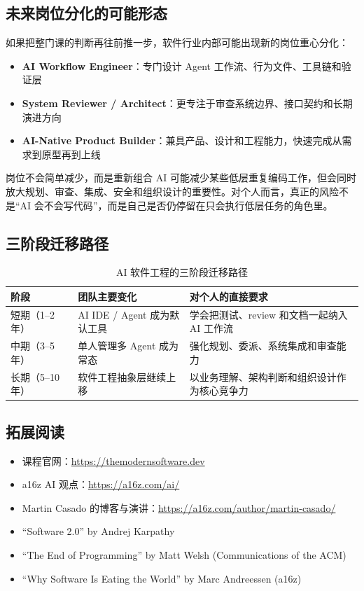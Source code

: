 \subsection{未来岗位分化的可能形态}

如果把整门课的判断再往前推一步，软件行业内部可能出现新的岗位重心分化：

\begin{itemize}
    \item \textbf{AI Workflow Engineer}：专门设计 Agent 工作流、行为文件、工具链和验证层
    \item \textbf{System Reviewer / Architect}：更专注于审查系统边界、接口契约和长期演进方向
    \item \textbf{AI-Native Product Builder}：兼具产品、设计和工程能力，快速完成从需求到原型再到上线
\end{itemize}

\begin{warningbox}{岗位不会简单减少，而是重新组合}
AI 可能减少某些低层重复编码工作，但会同时放大规划、审查、集成、安全和组织设计的重要性。对个人而言，真正的风险不是“AI 会不会写代码”，而是自己是否仍停留在只会执行低层任务的角色里。
\end{warningbox}

\subsection{三阶段迁移路径}

\begin{table}[H]
\centering
\begin{tabular}{p{} p{} p{}}
\toprule
阶段 & 团队主要变化 & 对个人的直接要求 \\
\midrule
短期（1--2 年） & AI IDE / Agent 成为默认工具 & 学会把测试、review 和文档一起纳入 AI 工作流 \\
中期（3--5 年） & 单人管理多 Agent 成为常态 & 强化规划、委派、系统集成和审查能力 \\
长期（5--10 年） & 软件工程抽象层继续上移 & 以业务理解、架构判断和组织设计作为核心竞争力 \\
\bottomrule
\end{tabular}
\caption{AI 软件工程的三阶段迁移路径}
\end{table}

\subsection{拓展阅读}

\begin{itemize}
    \item 课程官网：\url{https://themodernsoftware.dev}
    \item a16z AI 观点：\url{https://a16z.com/ai/}
    \item Martin Casado 的博客与演讲：\url{https://a16z.com/author/martin-casado/}
    \item ``Software 2.0'' by Andrej Karpathy
    \item ``The End of Programming'' by Matt Welsh (Communications of the ACM)
    \item ``Why Software Is Eating the World'' by Marc Andreessen (a16z)
\end{itemize}



